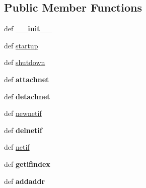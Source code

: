 \subsection*{Public Member Functions}
\begin{DoxyCompactItemize}
\item 
\hypertarget{classcore_1_1netns_1_1nodes_1_1_r_j45_node_a4c9e96a1511784f090f6cf2692016a61}{def {\bfseries \+\_\+\+\_\+init\+\_\+\+\_\+}}\label{classcore_1_1netns_1_1nodes_1_1_r_j45_node_a4c9e96a1511784f090f6cf2692016a61}

\item 
def \hyperlink{classcore_1_1netns_1_1nodes_1_1_r_j45_node_a03c34ff778754ab0516a4fa014cd8b50}{startup}
\item 
def \hyperlink{classcore_1_1netns_1_1nodes_1_1_r_j45_node_a5619902e86d46e0d0e5dc83ff5e73aa1}{shutdown}
\item 
\hypertarget{classcore_1_1netns_1_1nodes_1_1_r_j45_node_aef2a2a2d1c48025f679fa161dba72141}{def {\bfseries attachnet}}\label{classcore_1_1netns_1_1nodes_1_1_r_j45_node_aef2a2a2d1c48025f679fa161dba72141}

\item 
\hypertarget{classcore_1_1netns_1_1nodes_1_1_r_j45_node_a0daa7ad62c697020cab37495d8b8475c}{def {\bfseries detachnet}}\label{classcore_1_1netns_1_1nodes_1_1_r_j45_node_a0daa7ad62c697020cab37495d8b8475c}

\item 
def \hyperlink{classcore_1_1netns_1_1nodes_1_1_r_j45_node_a3ddf5dc801e2d90ec579f8b6c74da052}{newnetif}
\item 
\hypertarget{classcore_1_1netns_1_1nodes_1_1_r_j45_node_af2f26e1a7f6d0466de673d74f14a6eda}{def {\bfseries delnetif}}\label{classcore_1_1netns_1_1nodes_1_1_r_j45_node_af2f26e1a7f6d0466de673d74f14a6eda}

\item 
def \hyperlink{classcore_1_1netns_1_1nodes_1_1_r_j45_node_a55e053d07f67b755605597760e79acf3}{netif}
\item 
\hypertarget{classcore_1_1netns_1_1nodes_1_1_r_j45_node_aebc1315adf89765ab54cd896f59cd8d5}{def {\bfseries getifindex}}\label{classcore_1_1netns_1_1nodes_1_1_r_j45_node_aebc1315adf89765ab54cd896f59cd8d5}

\item 
\hypertarget{classcore_1_1netns_1_1nodes_1_1_r_j45_node_ae158e6e19199a117a7247f683ef83c3a}{def {\bfseries addaddr}}\label{classcore_1_1netns_1_1nodes_1_1_r_j45_node_ae158e6e19199a117a7247f683ef83c3a}


\end{DoxyCompactItemize}
